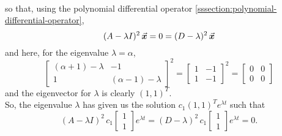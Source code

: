 \documentclass[../MathsNotesBase.tex]{subfiles}
\begin{document}
{\[\begin{aligned}
		\end{aligned}\]
		so that, using the polynomial differential operator \autoref{sssection:polynomial-differential-operator},
		\[ (A - \lambda I)^2 \, \vec{\bm{x}} = 0  = (D - \lambda)^2 \, \vec{\bm{x}} \]
		and here, for the eigenvalue ${ \lambda = \alpha }$,
		\[ 
			\begin{bmatrix}
				(\alpha + 1) - \lambda & -1\\
				1 & (\alpha - 1) - \lambda
			\end{bmatrix}^2 = 
			\begin{bmatrix}
				1 & -1\\
				1 & -1
			\end{bmatrix}^2 =
			\begin{bmatrix}
				0 & 0\\
				0 & 0
			\end{bmatrix}
		\]
		and the eigenvector for $\lambda$ is clearly ${ (1, 1)^T }$.\\
		
		So, the eigenvalue $\lambda$ has given us the solution ${ c_1 (1, 1)^T e^{\lambda t} }$ such that
		\[ (A - \lambda I)^2 \, c_1 \begin{bmatrix}1\\ 1\end{bmatrix} e^{\lambda t} = (D - \lambda)^2 \, c_1 \begin{bmatrix}1\\ 1\end{bmatrix} e^{\lambda t} = 0. \]
		
}
\end{document}
